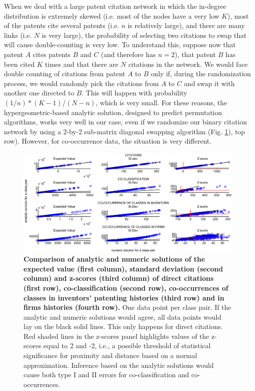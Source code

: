 \documentclass[]{svjour3}
\begin{document}
When we deal with a large patent citation network in which the in-degree distribution is extremely skewed (i.e. most of the nodes have a very low $K$), most of the patents cite several patents (i.e. $n$ is relatively large), and there are many links (i.e. $N$ is very large), the probability of selecting two citations to swap that will cause double-counting is very low. To understand this, suppose now that patent $A$ cites patents $B$ and $C$ (and therefore has $n=2$), that patent $B$ has been cited $K$ times and that there are $N$ citations in the network. We would face double counting of citations from patent $A$ to $B$ only if, during the randomization process, we would randomly pick the citations from $A$ to $C$ and swap it with another one directed to $B$. This will happen with probability $(1/n)*(K-1)/(N-n)$, which is very small. For these reasons, the hypergeometric-based analytic solution, designed to predict permutation algorithms, works very well in our case, even if we randomize our binary citation network by using a 2-by-2 sub-matrix diagonal swapping algorithm (Fig. \ref{Comparison_ANAvsNUM}), top row). However, for co-occurrence data, the situation is very different. 

\begin{figure}[]
\centering
\includegraphics[width=\textwidth]{figs/Comparison_ANAvsNUM.png} 
\caption{\textbf{Comparison of analytic and numeric solutions of the expected value (first column), standard deviation (second column) and z-scores (third column) of direct citations (first row), co-classification (second row), co-occurrences of classes in inventors' patenting histories (third row) and in firms histories (fourth row).} One data point per class pair. If the analytic and numeric solutions would agree, all data points would lay on the black solid lines. This only happens for direct citations. Red shaded lines in the z-scores panel highlights values of the z-scores equal to 2 and -2, i.e., a possible threshold of statistical significance for proximity and distance based on a normal approximation. Inference based on the analytic solutions would cause both type I and II errors for co-classification and co-occurrences. 
}\label{Comparison_ANAvsNUM}
\end{figure}
\end{document}
